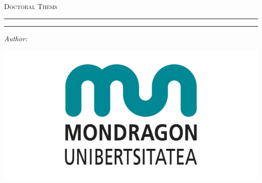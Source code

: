 %
%

\begin{titlepage}
	\begin{center}
		
		
		\textsc{\Large Doctoral Thesis}\\[3cm] %
	
		\hrule height 0.2pt %
		\vspace{0.5cm} %
		
		{\huge \bfseries \myTitle\par} %
		
		\vspace{1cm} %
		\hrule height 0.2pt %
		
		\vspace{4cm}
		
		\textit{Author:}\\[0.4cm]
		
		{\Large \myName}
		
		\vspace{3cm}
		
		\vfill
		
		\includegraphics[width=0.6\linewidth]{Logos/MU_logo.jpg}\\ %
		
		
		
		\vfill
	\end{center}
\end{titlepage}